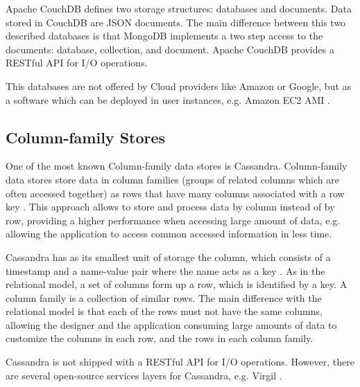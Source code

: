 Apache CouchDB defines two storage structures: databases and documents. Data stored in CouchDB are \ac{JSON} documents. The main difference between this two described databases is that MongoDB implements a two step access to the documents: database, collection, and document. Apache CouchDB provides a RESTful \ac{API} for I/O operations.

This databases are not offered by Cloud providers like Amazon or Google, but as a software which can be deployed in user instances, e.g. Amazon EC2 AMI \cite{amazonec2}. 

\subsection{Column-family Stores}

One of the most known Column-family data stores is Cassandra. Column-family data stores store data in column families (groups of related columns which are often accessed together) as rows that have many columns associated with a row key \cite{nosql2012}. This approach allows to store and process data by column instead of by row, providing a higher performance when accessing large amount of data, e.g. allowing the application to access common accessed information in less time.

Cassandra has as its smallest unit of storage the column, which consists of a timestamp and a name-value pair where the name acts as a key \cite{nosql2012}. As in the relational model, a set of columns form up a row, which is identified by a key. A column family is a collection of similar rows. The main difference with the relational model is that each of the rows must not have the same columns, allowing the designer and the application consuming large amounts of data to customize the columns in each row, and the rows in each column family.

Cassandra is not shipped with a RESTful API for I/O operations. However, there are several open-source services layers for Cassandra, e.g. Virgil \cite{virgil}.

\FloatBarrier
